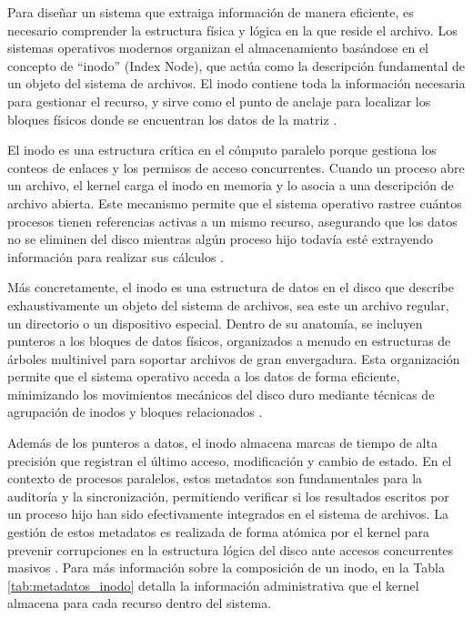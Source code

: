 Para diseñar un sistema que extraiga información de manera eficiente, es necesario comprender la estructura física y lógica en la que reside el archivo. Los sistemas operativos modernos organizan el almacenamiento basándose en el concepto de \enquote{inodo} (Index Node), que actúa como la descripción fundamental de un objeto del sistema de archivos. El inodo contiene toda la información necesaria para gestionar el recurso, y sirve como el punto de anclaje para localizar los bloques físicos donde se encuentran los datos de la matriz \cite{stanford_cs111, berkeley_cs162}.

El inodo es una estructura crítica en el cómputo paralelo porque gestiona los conteos de enlaces y los permisos de acceso concurrentes. Cuando un proceso abre un archivo, el kernel carga el inodo en memoria y lo asocia a una descripción de archivo abierta. Este mecanismo permite que el sistema operativo rastree cuántos procesos tienen referencias activas a un mismo recurso, asegurando que los datos no se eliminen del disco mientras algún proceso hijo todavía esté extrayendo información para realizar sus cálculos \cite{mit_6828, stanford_cs111}.

Más concretamente, el inodo es una estructura de datos en el disco que describe exhaustivamente un objeto del sistema de archivos, sea este un archivo regular, un directorio o un dispositivo especial. Dentro de su anatomía, se incluyen punteros a los bloques de datos físicos, organizados a menudo en estructuras de árboles multinivel para soportar archivos de gran envergadura. Esta organización permite que el sistema operativo acceda a los datos de forma eficiente, minimizando los movimientos mecánicos del disco duro mediante técnicas de agrupación de inodos y bloques relacionados \cite{mit_6828, berkeley_cs162}.

Además de los punteros a datos, el inodo almacena marcas de tiempo de alta precisión que registran el último acceso, modificación y cambio de estado. En el contexto de procesos paralelos, estos metadatos son fundamentales para la auditoría y la sincronización, permitiendo verificar si los resultados escritos por un proceso hijo han sido efectivamente integrados en el sistema de archivos. La gestión de estos metadatos es realizada de forma atómica por el kernel para prevenir corrupciones en la estructura lógica del disco ante accesos concurrentes masivos \cite{ieee2017posix, mit_6828}. Para más información sobre la composición de un inodo, en la Tabla \ref{tab:metadatos_inodo} detalla la información administrativa que el kernel almacena para cada recurso dentro del sistema.


